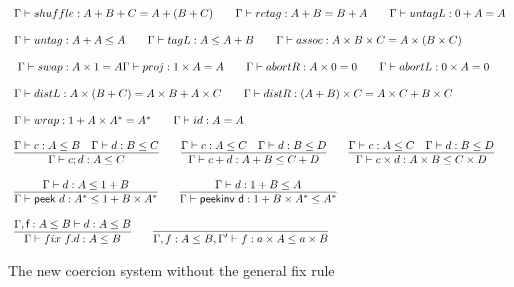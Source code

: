 \documentclass[a4paper,UKenglish,cleveref, autoref, thm-restate]{lipics-v2021}
\begin{document}
\begin{figure}
\caption{The new coercion system without the general fix rule}
\label{fig:system}
\centering
\begin{displaymath}
\begin{array}{lll}
\myaxiomC{shuffle}{A + B + C}{A + (B + C)} \qquad  
\myaxiomC{retag}{A + B}{B + A} \qquad 
\myaxiomC{untagL}{0 + A}{A} 
\\\\
\containsG{untag}{A + A}{A}   \qquad \containsG{tagL}{A}{A + B} \qquad

\myaxiomC{assoc}{A \times B \times C}{A \times (B \times C)}
\\\\\
\myaxiomC{swap}{A \times 1}{A} 
\myaxiomC{proj}{1 \times A}{A} \qquad
\myaxiomC{abortR}{A \times 0}{0} \qquad
\myaxiomC{abortL}{0 \times A}{0} 
\\\\
\myaxiomC{distL}{A \times (B + C)} {A \times B + A \times C} \qquad
\myaxiomC{distR}{(A + B)\times C}{A \times C + B \times C} 
\\\\
\myaxiomC{wrap}{1 + A \times A^*}{A^* } \qquad \myaxiomC{id}{A}{A}
\\\\
\infer{\containsG{c;d}{A}{C}}{\containsG{c}{A}{B} & \containsG{d}{B}{C}} \qquad

\infer{\containsG{c + d}{A + B}{ C + D}}{\containsG{c}{A}{C} & \containsG{d}{B}{D}}  \qquad

\infer{\containsG{c \times d}{A \times B}{ C \times D}}{\containsG{c}{A}{C} & \containsG{d}{B}{D}} 
\\\\
\infer{\containsG{\dslcom{peek}~d}{A^*}{1 + B \times A^*}}{\containsG{d}{A}{1 + B}} \qquad
\infer{\containsG{\dslcom{peekinv d}}{1 + B \times A^*}{A^*}}{\containsG{d}{1 + B}{A}} 
\\\\
\infer{\contains{\Gamma}{\fix ~f.d}{A}{B}}{ \contains{\Gamma, \dslcom{f}: A \leq B}{d}{A}{B}} \qquad
\infer{\contains{\Gamma, f : A \leq B, \Gamma'}{f}{a \times A}{a \times B}}{}
\end{array}
\end{displaymath}
\end{figure}
\end{document}
